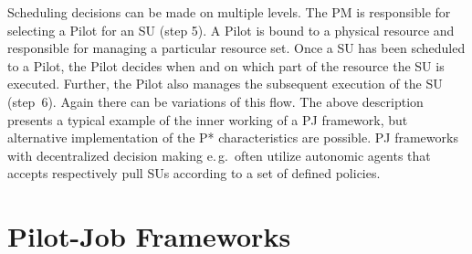 \documentclass[conference,final]{IEEEtran}
\newcommand{\jhanote}[1]{ {\textcolor{red} { ***shantenu: #1 }}}
\newcommand{\alnote}[1]{ {\textcolor{blue} { ***andreL: #1 }}}
\newcommand{\note}[1]{ {\textcolor{magenta} { ***Note: #1 }}}
\newcommand{\alnote}[1]{}
\newcommand{\jhanote}[1]{}
\newcommand{\note}[1]{}
\newcommand{\pilot}{Pilot\xspace}
\newcommand{\upp}{\vspace*{-0.5em}}
\begin{document}
Scheduling decisions can be made on multiple levels. The PM is responsible for
selecting a \pilot for an SU (step 5). A \pilot is bound to a physical resource
and responsible for managing a particular resource set. Once a SU has been
scheduled to a \pilot, the \pilot decides when and on which part of the resource
the SU is executed.
Further, the \pilot also manages the subsequent execution of the SU (step~6).
Again there can be variations of this flow. The above description presents a
typical example of the inner working of a PJ framework, but alternative
implementation of the P* characteristics are possible. PJ frameworks with
decentralized decision making e.\,g.\ often utilize autonomic agents that
accepts respectively pull SUs according to a set of defined policies.


\section{Pilot-Job Frameworks\upp\upp}

\end{document}
